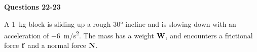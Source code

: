 \documentclass{../../oss-apphys}
\begin{document}
\begin{multicols}{2}
\begin{enumerate}[resume,leftmargin=18pt]
  \end{enumerate}
  
  \textbf{Questions 22-23}

  A \SI{1}{\kilo\gram} block is sliding up a rough \ang{30} incline and is
  slowing down with an acceleration of \SI{-6}{m/s^2}. The mass has a weight
  $\mathbf{W}$, and encounters a frictional force $\mathbf{f}$ and a normal force
  $\mathbf{N}$.
  \begin{center}
  \end{center}
  \begin{enumerate}[resume,leftmargin=18pt]
    

\end{enumerate}
\end{multicols}
\end{document}
